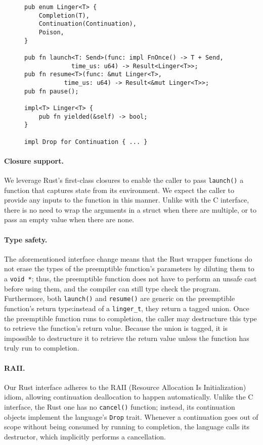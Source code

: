 \begin{figure}
\begin{lstlisting}[label=lst:ingerrustapi,caption=Preemptible functions Rust interface,morekeywords={fn,impl,mut,pub,self,u64,Drop,Result,Send}]
pub enum Linger<T> {
	Completion(T),
	Continuation(Continuation),
	Poison,
}

pub fn launch<T: Send>(func: impl FnOnce() -> T + Send,
			 time_us: u64) -> Result<Linger<T>>;
pub fn resume<T>(func: &mut Linger<T>,
		   time_us: u64) -> Result<&mut Linger<T>>;
pub fn pause();

impl<T> Linger<T> {
	pub fn yielded(&self) -> bool;
}

impl Drop for Continuation { ... }
\end{lstlisting}
\end{figure}

\paragraph{Closure support.}
We leverage Rust's first-class closures to enable the caller to pass
\texttt{launch()} a function that captures state from its environment.  We expect the
caller to provide any inputs to the function in this manner.  Unlike with the C
interface, there is no need to wrap the arguments in a struct when there are
multiple, or to pass an empty value when there are none.


\paragraph{Type safety.}
The aforementioned interface change means that the Rust wrapper functions do not
erase the types of the preemptible function's parameters by diluting them to a
\texttt{void *}; thus, the preemptible function does not have to perform an unsafe
cast before using them, and the compiler can still type check the program.
Furthermore, both \texttt{launch()} and \texttt{resume()} are generic on the
preemptible function's return type:\@ instead of a \texttt{linger\_t}, they return a
tagged union.  Once the preemptible function runs to completion, the caller may
destructure this type to retrieve the function's return value.  Because the union is
tagged, it is impossible to destructure it to retrieve the return value unless the
function has truly run to completion.


\paragraph{RAII.}
Our Rust interface adheres to the RAII (Resource Allocation Is Initialization) idiom,
allowing continuation deallocation to happen automatically.  Unlike the C interface,
the Rust one has no \texttt{cancel()} function; instead, its continuation objects
implement the language's \texttt{Drop} trait.  Whenever a continuation goes out of
scope without being consumed by running to completion, the language calls its
destructor, which implicitly performs a cancellation.


